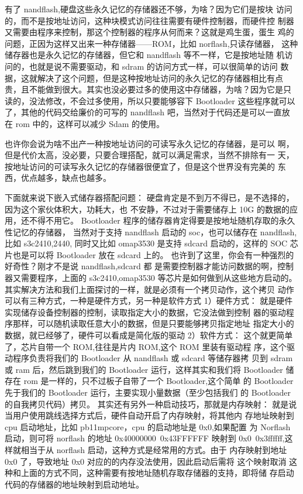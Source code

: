 有了 nandflash,硬盘这些永久记忆的存储器还不够，为啥？因为它们是按块
访问的，而不是按地址访问，这种块模式访问往往需要有硬件控制器，而硬件控
制器又需要由程序来控制，那这个控制器的程序从何而来？这就是鸡生蛋，蛋生
鸡的问题，正因为这样又出来一种存储器——ROM，比如 norflash,只读存储器，
这种储存器也是永久记忆的存储器，但它和 nandflash 等不一样，它是按地址随
机访问的，也就是说不需要驱动，和 sdram 的访问方式一样，可以很简单的访问
数据，这就解决了这个问题，但是这种按地址访问的永久记忆的存储器相比有点
贵，且不能做到很大。其实也没必要过多的使用这中存储器，为啥？因为它是只
读的，没法修改，不会过多使用，所以只要能够容下 Bootloader 这些程序就可以
了，其他的代码交给廉价的可写的 nandflash 吧，当然对于代码还是可以一直放
在 rom 中的，这样可以减少 Sdam 的使用。

也许你会说为啥不出产一种按地址访问的可读写永久记忆的存储器，是可以
啊，但是代价太高，没必要，只要合理搭配，就可以满足需求，当然不排除有一
天，按地址访问的可读写永久记忆的存储器很便宜了，但是这个世界没有完美的
东西，优点越多，缺点也越多。

下面就来说下嵌入式储存器搭配问题：
硬盘肯定是不到万不得已，是不选择的，因为这个家伙体积大，功耗大，也
不安静，不过对于需要储存上 10G 的数据的应用，还不得不用它。
Bootloader 程序的储存器肯定得要是按地址随机存取的永久性记忆的存储器，
当然对于支持 nandflash 启动的 soc，也可以储存在 nandflash,比如 s3c2410,2440,
同时又比如 omap3530 是支持 sdcard 启动的，这样的 SOC 芯片也是可以将
Bootloader 放在 sdcard 上的。
也许到了这里，你会有一种强烈的好奇性？刚才不是说 nandflash,sdcard 都
是需要控制器才能访问数据的啊，控制器又需要程序，上面的 s3c2410,omap3530
等芯片是如何做到从这些地方启动的。
其实解决方法和我们上面探讨的一样，就是必须有一个拷贝动作，这个拷贝
动作可以有三种方式，一种是硬件方式，另一种是软件方式
1）硬件方式：
就是硬件实现储存设备控制器的控制，读取指定大小的数据，它没法做到控制
器的驱动程序那样，可以随机读取任意大小的数据，但是只要能够拷贝指定地址
指定大小的数据，就已经够了，硬件可以看成是简化版的驱动
2）软件方式： 
这个就更简单了，芯片自带一个 ROM,往往是片内 ROM,这个 ROM 里装有驱动程
序，这个驱动程序负责将我们的 Bootloader 从 nandflash 或 sdcard 等储存器拷
贝到 sdram 或 ram 后，然后跳到我们的 Bootloader 运行，这样其实和我们将
Bootloader 储存在 rom 是一样的，只不过板子自带了一个 Bootloader,这个简单
的 Bootloader 先于我们的 Bootloader 运行，主要实现小量数据（至少包括我们
的 Bootloader 的自我拷贝代码）拷贝。
其实还有另外一种启动技巧，那就是内存映射：
就是说当用户使用跳线选择方式后，硬件自动开启了内存映射，将其他内
存地址映射到 cpu 启动地址，比如 pb11mpcore，cpu 的启动地址是 0x0,如果配置
为 Norflash 启动，则可将 norflash 的地址 0x40000000~0x43FFFFFF 映射到
0x0~0x3ffffff,这样就相当于从 norflash 启动，这种方式是经常用的方式。由于
内存映射到地址 0x0 了，导致地址 0x0 对应的的内存没法使用，因此启动后需将
这个映射取消
这种和上面的方式不同，这种需要有按地址随机存取存储器的支持，即将储
存启动代码的存储器的地址映射到启动地址。

